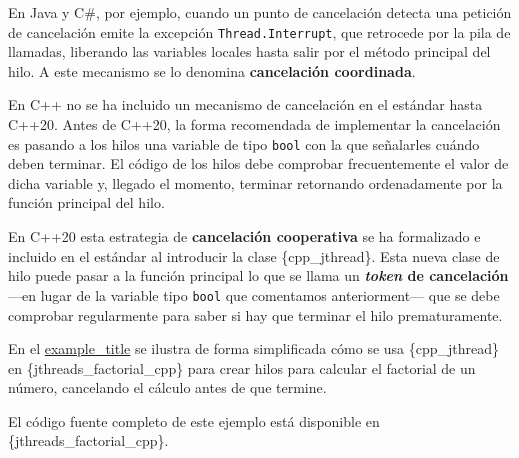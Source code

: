En Java y C\#, por ejemplo, cuando un punto de cancelación detecta una
petición de cancelación emite la excepción \texttt{Thread.Interrupt},
que retrocede por la pila de llamadas, liberando las variables locales
hasta salir por el método principal del hilo. A este mecanismo se lo
denomina \textbf{cancelación coordinada}{}.

En C++ no se ha incluido un mecanismo de cancelación en el estándar
hasta C++20. Antes de C++20, la forma recomendada de implementar la
cancelación es pasando a los hilos una variable de tipo \texttt{bool}
con la que señalarles cuándo deben terminar. El código de los hilos debe
comprobar frecuentemente el valor de dicha variable y, llegado el
momento, terminar retornando ordenadamente por la función principal del
hilo.

En C++20 esta estrategia de \textbf{cancelación cooperativa}{} se ha
formalizado e incluido en el estándar al introducir la clase
\{cpp\_jthread\}. Esta nueva clase de hilo puede pasar a la función
principal lo que se llama un \textbf{{}\emph{token} de cancelación}{}
---en lugar de la variable tipo \texttt{bool} que comentamos
anteriorment--- que se debe comprobar regularmente para saber si hay que
terminar el hilo prematuramente.

En el \hyperref[ejemplo-jthread]{example\_title} se ilustra de forma
simplificada cómo se usa \{cpp\_jthread\} en
\{jthreads\_factorial\_cpp\} para crear hilos para calcular el factorial
de un número, cancelando el cálculo antes de que termine.

El código fuente completo de este ejemplo está disponible en
\{jthreads\_factorial\_cpp\}.

